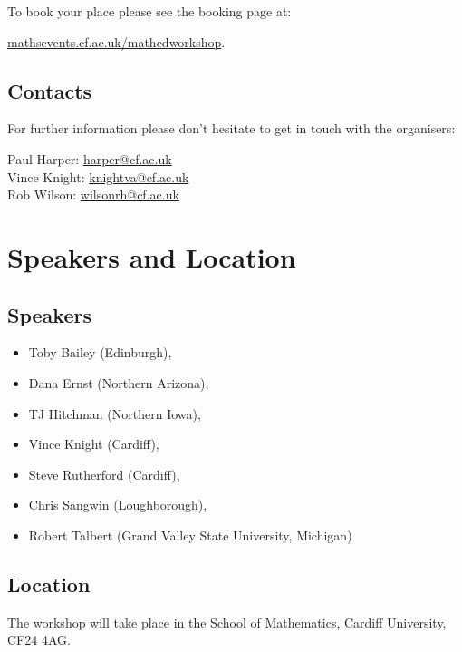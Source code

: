 \documentclass {leaflet}
\begin{document}
To book your place please see the booking page at:
\begin{center}
\url{mathsevents.cf.ac.uk/mathedworkshop}.
\end{center}

\subsection{Contacts}
For further information please don't hesitate to get in touch with the organisers:

\begin{center}
Paul Harper: \url{harper@cf.ac.uk}\\
Vince Knight: \url{knightva@cf.ac.uk}\\
Rob Wilson: \url{wilsonrh@cf.ac.uk}
\end{center}

\newpage
\section{Speakers and Location}
\subsection{Speakers}

\begin{itemize}
\item Toby Bailey (Edinburgh),
\item Dana Ernst (Northern Arizona),
\item TJ Hitchman (Northern Iowa),
\item Vince Knight (Cardiff),
\item Steve Rutherford (Cardiff),
\item Chris Sangwin (Loughborough),
\item Robert Talbert (Grand Valley State University, Michigan)
\end{itemize}

\subsection{Location}

The workshop will take place in the School of Mathematics, Cardiff University, CF24 4AG.\\
\end{document}
